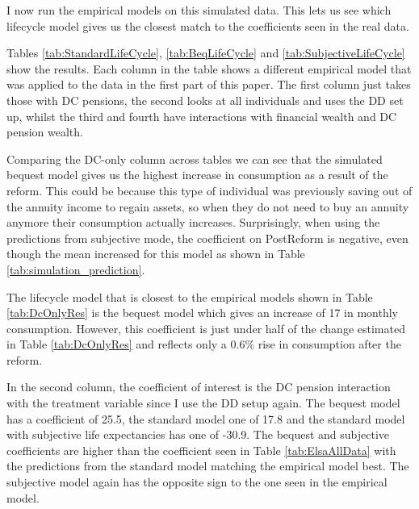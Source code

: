 \documentclass[12pt]{article}
\begin{document}
I now run the empirical models on this simulated data. This lets us
see which lifecycle model gives us the closest match to the coefficients seen in the
real data.

\begin{landscape}
    \linespread{1.25}

    
\end{landscape}

\begin{landscape}
    \linespread{1.25}

    
\end{landscape}

\begin{landscape}
    \linespread{1.25}

    
\end{landscape}


Tables \ref{tab:StandardLifeCycle}, \ref{tab:BeqLifeCycle} and
\ref{tab:SubjectiveLifeCycle} show the results. Each column in the table shows a
different empirical model that was applied to the data in the first part of this
paper. The first column just takes those with DC pensions, the second looks at
all individuals and uses the DD set up, whilst the third and fourth have
interactions with financial wealth and DC pension wealth.

Comparing the DC-only column across tables we can see that the simulated bequest
model gives us the highest increase in consumption as a result of the reform.
This could be because this type of individual was previously saving out of the
annuity income to regain assets, so when they do not need to buy an annuity
anymore their consumption actually increases. Surprisingly, when using the predictions from
subjective mode, the coefficient on PostReform is negative, even though the mean
increased for this model as shown in Table \ref{tab:simulation_prediction}.

The lifecycle model that is closest to the empirical models shown in Table
\ref{tab:DcOnlyRes} is the bequest model which gives an increase of 17 in
monthly consumption. However, this coefficient is just under half of the change
estimated in Table \ref{tab:DcOnlyRes} and reflects only a 0.6\% rise in
consumption after the reform.

In the second column, the coefficient of interest is the DC pension interaction
with the treatment variable since I use the DD setup again. The bequest model
has a coefficient of 25.5, the standard model one of 17.8 and the standard model
with subjective life expectancies has one of -30.9. The bequest and subjective
coefficients are
higher than the coefficient seen in Table \ref{tab:ElsaAllData} with the
predictions from the standard model matching the empirical model best. The
subjective model again has the opposite sign to the one seen in the empirical
model.
\end{document}
